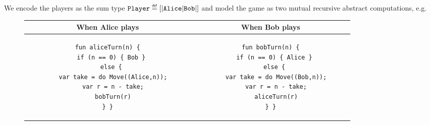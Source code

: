 We encode the players as the sum type $\type{Player} \defas [|\code{Alice}|\code{Bob}|]$ and model the game as two mutual recursive abstract computations, e.g.
\begin{figure*}[h]
  \centering
  \begin{tabular}{ c | c }
When Alice plays  & When Bob plays \\
\hline
    \begin{subfigure}[c]{0.51\linewidth}
\begin{lstlisting}[style=links]
fun aliceTurn(n) {
  if (n == 0) { Bob }
  else {
   var take = do Move((Alice,n));
   var r = n - take;
   bobTurn(r)
} }
\end{lstlisting}
    \end{subfigure}
     &
    \begin{subfigure}[c]{0.49\linewidth}
\begin{lstlisting}[style=links]
fun bobTurn(n) {
  if (n == 0) { Alice }
  else {
   var take = do Move((Bob,n));
   var r = n - take;
   aliceTurn(r)
} }
\end{lstlisting}
    \end{subfigure}
\end{tabular}
\end{figure*}

